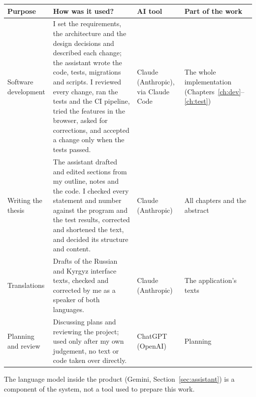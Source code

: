 {\smallskip
\renewcommand{\arraystretch}{1.1}
\begin{tabularx}{\textwidth}{@{}>{\raggedright\arraybackslash}p{2.1cm} >{\raggedright\arraybackslash}X
	>{\raggedright\arraybackslash}p{2.1cm} >{\raggedright\arraybackslash}p{2.4cm}@{}}
	\toprule
	\textbf{Purpose} & \textbf{How was it used?} & \textbf{AI tool} & \textbf{Part of the work} \\
	\midrule
	Software development & I set the requirements, the architecture and the design decisions and described each
	change; the assistant wrote the code, tests, migrations and scripts. I reviewed every change, ran the tests and the
	CI pipeline, tried the features in the browser, asked for corrections, and accepted a change only when the tests
	passed. & Claude (Anthropic), via Claude Code & The whole implementation (Chapters~\ref{ch:dev}--\ref{ch:test}) \\
	\midrule
	Writing the thesis & The assistant drafted and edited sections from my outline, notes and the code. I checked every
	statement and number against the program and the test results, corrected and shortened the text, and decided its
	structure and content. & Claude (Anthropic) & All chapters and the abstract \\
	\midrule
	Translations & Drafts of the Russian and Kyrgyz interface texts, checked and corrected by me as a speaker of both
	languages. & Claude (Anthropic) & The application's texts \\
	\midrule
	Planning and review & Discussing plans and reviewing the project; used only after my own judgement, no text or code
	taken over directly. & ChatGPT (OpenAI) & Planning \\
	\bottomrule
\end{tabularx}

\smallskip
\noindent The language model inside the product (Gemini, Section~\ref{sec:assistant}) is a component of the system, not a tool
used to prepare this work.

}
